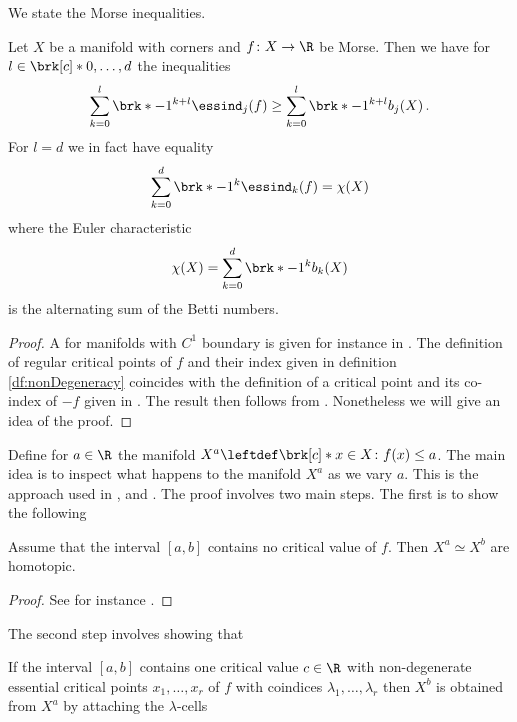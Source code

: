 We state the Morse inequalities.
\begin{theorem}
Let $X$ be a manifold with corners and $f\colon X\to\R$ be Morse.
Then we have for $l\in\brk[c]*{0,\dots,d}$ the inequalities
\begin{align*}
  \sum_{k=0}^l \brk*{-1}^{k+l}\essind_j(f)\geq \sum_{k=0}^l\brk*{-1}^{k+l}b_j(X)\,.
\end{align*}
For $l=d$ we in fact have equality
\begin{align*}
  \sum_{k=0}^d \brk*{-1}^{k}\essind_k(f)= \chi(X)
\end{align*}
where the Euler characteristic
\begin{align*}
  \chi(X)=\sum_{k=0}^d\brk*{-1}^{k}b_k(X)
\end{align*}
is the alternating sum of the Betti numbers.
\end{theorem}
\begin{proof}
  A for manifolds with $C^1$ boundary is given for instance in \cite[Theorem 10.2']{Morse1969}.
  The definition of regular critical points of $f$ and their index given in definition \ref{df:nonDegeneracy} coincides with 
  the definition of a critical point and its co-index of $-f$ given in \cite{Agrach1991}.
  The result then follows from \cite[Theorem 2.4]{Agrach1991}.
  Nonetheless we will give an idea of the proof.
\end{proof} 
Define for $a\in\R$ the manifold $X^a\leftdef\brk[c]*{x\in X\colon f(x)\leq a}$.
The main idea is to inspect what happens to the manifold $X^a$ as we vary $a$.
This is the approach used in \cite{Milnor1963}, \cite{Agrach1991} and \cite{Handron2002}.
The proof involves two main steps. The first is to show the following
\begin{lemma}
  Assume that the interval $[a,b]$ contains no critical value of $f$.
  Then $X^a\simeq X^b$ are homotopic.
\end{lemma}
\begin{proof}
  See for instance \cite[p.7]{Agrach1991}.
\end{proof}
The second step involves showing that
\begin{lemma}
  If the interval $[a,b]$ contains one critical value $c\in\R$ with non-degenerate essential critical points
  $x_1,\dots,x_r$ of $f$ with coindices $\lambda_1,\dots,\lambda_r$
  then $X^b$ is obtained from $X^a$ by attaching the $\lambda$-cells
\end{lemma}

